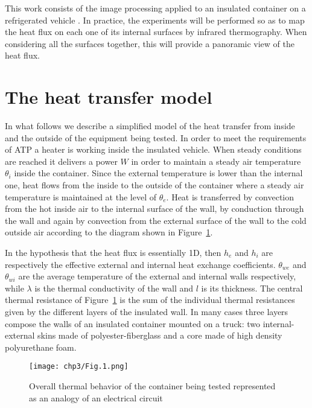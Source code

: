 This work consists of the image processing applied to an insulated container on a refrigerated vehicle \citet{bison1993automatic,bison2012geometrical}. In practice, the experiments will be performed so as to map the heat flux on each one of its internal surfaces by infrared thermography. When considering all the surfaces together, this will provide a panoramic view of the heat flux.


\section{The heat transfer model}

In what follows we describe a simplified model of the heat transfer from inside and the outside of the equipment being tested. In order to meet the requirements of ATP a heater is working inside the insulated vehicle. When steady conditions are reached it delivers a power $ W $ in order to maintain a steady air temperature $ \theta_i $ inside the container. Since the external temperature is lower than the internal one, heat flows from the inside to the outside of the container where a steady air temperature is maintained at the level of $ \theta_e $. Heat is transferred by convection from the hot inside air to the internal surface of the wall, by conduction through the wall and again by convection from the external surface of the wall to the cold outside air according to the diagram shown in Figure~\ref{Therm_Res}. 

In the hypothesis that the heat flux is essentially 1D,  then $ h_e $ and $ h_i $ are respectively the effective external and internal heat exchange coefficients. $ \theta_{we} $ and $ \theta_{wi} $ are the average temperature of the external and internal walls respectively, while $\lambda $ is the thermal conductivity of the wall and $l$ is its thickness. The central thermal resistance of Figure~\ref{Therm_Res} is the sum of the individual thermal resistances given by the different layers of the insulated wall. In many cases three layers compose the walls of an insulated container mounted on a truck: two internal-external skins made of polyester-fiberglass and a core made of high density polyurethane foam.
\begin{figure}[ht]
    \centering
    \texttt{[image: chp3/Fig.1.png]}
    \caption{Overall thermal behavior of the container being tested represented as an analogy of an electrical circuit}
    \label{Therm_Res}
\end{figure}


